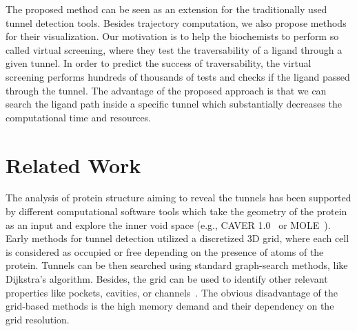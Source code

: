 \documentclass{svmult}
\newcommand{\red}[1]{\textcolor{red}{#1}}
\begin{document}
The proposed method can be seen as an extension for the traditionally used tunnel detection tools.
Besides trajectory computation, we also propose methods for their visualization.
Our motivation is to help the biochemists to perform so called virtual screening, where they test the traversability of a ligand through a given tunnel.
In order to predict the success of traversability, the virtual screening performs hundreds of thousands of tests and checks if the ligand passed through the tunnel.
The advantage of the proposed approach is that we can search the ligand path inside a specific tunnel which substantially decreases the computational time and resources.



\section{Related Work}


The analysis of protein structure aiming to reveal the tunnels has been supported by different computational software tools which take the geometry of the protein as an input and explore the inner void space (e.g., CAVER 1.0~\cite{petrek2006caver} or MOLE~\cite{Petrek20071357}). 
Early methods for tunnel detection utilized a discretized 3D grid, where each cell is considered as occupied or free depending
on the presence of atoms of the protein.
Tunnels can be then searched using standard graph-search methods, like Dijkstra's algorithm.
Besides, the grid can be used to identify other relevant properties like 
pockets, cavities, or channels~\cite{sehnal2013mole,petrek2006caver}.
The obvious disadvantage of the grid-based methods is the high memory demand and their dependency on the grid resolution.
\end{document}
